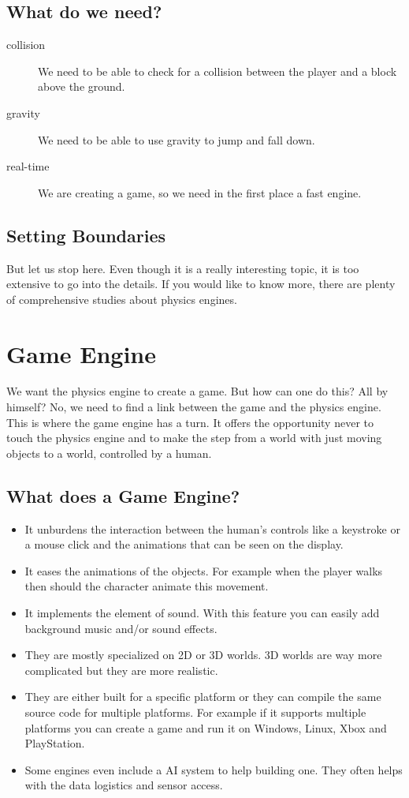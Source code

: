 \subsection{What do we need?}
\begin{description}
  \item[collision] We need to be able to check for a collision between the player and a block above the ground.
  \item[gravity] We need to be able to use gravity to jump and fall down. 
  \item[real-time] We are creating a game, so we need in the first place a fast engine.
\end{description}
\subsection{Setting Boundaries}
But let us stop here. Even though it is a really interesting topic, it is too extensive to go into the details. If you would like to know more, there are plenty of comprehensive studies about physics engines.
\newpage

\section{Game Engine}
We want the physics engine to create a game. But how can one do this? All by himself? No, we need to find a link between the game and the physics engine. This is where the game engine has a turn. It offers the opportunity never to touch the physics engine and to make the step from a world with just moving objects to a world, controlled by a human.
\subsection{What does a Game Engine?}
\begin{itemize}
  \item It unburdens the interaction between the human's controls like a keystroke or a mouse click and the animations that can be seen on the display.
  \item It eases the animations of the objects. For example when the player walks then should the character animate this movement.
  \item It implements the element of sound. With this feature you can easily add background music and/or sound effects.
  \item They are mostly specialized on 2D or 3D worlds. 3D worlds are way more complicated but they are more realistic.
  \item They are either built for a specific platform or they can compile the same source code for multiple platforms. For example if it supports multiple platforms you can create a game and run it on Windows, Linux, Xbox and PlayStation.
  \item Some engines even include a AI system to help building one. They often helps with the data logistics and sensor access.
\end{itemize}

